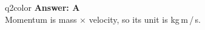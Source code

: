 
\begin{ansbox}{q2color}
\textbf{Answer: A}\\[4pt]
Momentum is mass $\times$ velocity, so its unit is kg\,m\,/\,s.
\end{ansbox}


